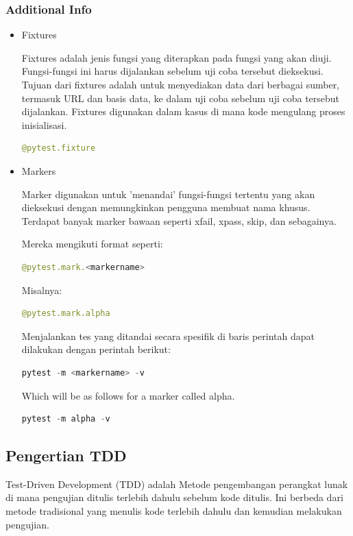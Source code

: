 \documentclass{article}
\begin{document}
\subsubsection{Additional Info}
\begin{itemize}
    \item Fixtures

          Fixtures adalah jenis fungsi yang diterapkan pada fungsi yang akan diuji. Fungsi-fungsi ini harus dijalankan sebelum uji coba tersebut dieksekusi. Tujuan dari fixtures adalah untuk menyediakan data dari berbagai sumber, termasuk URL dan basis data, ke dalam uji coba sebelum uji coba tersebut dijalankan. Fixtures digunakan dalam kasus di mana kode mengulang proses inisialisasi.
          \begin{lstlisting}[language=Python, caption={}, captionpos=b]
    @pytest.fixture 
    \end{lstlisting}

    \item Markers

          Marker digunakan untuk 'menandai' fungsi-fungsi tertentu yang akan dieksekusi dengan memungkinkan pengguna membuat nama khusus. Terdapat banyak marker bawaan seperti xfail, xpass, skip, dan sebagainya.

          Mereka mengikuti format seperti:
          \begin{lstlisting}[language=Python, caption={}, captionpos=b]
    @pytest.mark.<markername> 
    \end{lstlisting}

          Misalnya:
          \begin{lstlisting}[language=Python, caption={}, captionpos=b]
    @pytest.mark.alpha 
    \end{lstlisting}

          Menjalankan tes yang ditandai secara spesifik di baris perintah dapat dilakukan dengan perintah berikut:
          \begin{lstlisting}[language=Python, caption={}, captionpos=b]
    pytest -m <markername> -v 
    \end{lstlisting}
          Which will be as follows for a marker called alpha.
          \begin{lstlisting}[language=Python, caption={}, captionpos=b]
    pytest -m alpha -v 
    \end{lstlisting}
\end{itemize}

\subsection{Pengertian TDD}
Test-Driven Development (TDD) adalah Metode pengembangan perangkat lunak di mana pengujian ditulis terlebih dahulu sebelum kode ditulis. Ini berbeda dari metode tradisional yang menulis kode terlebih dahulu dan kemudian melakukan pengujian.
\end{document}
